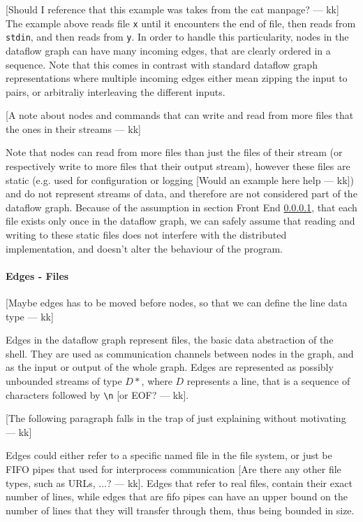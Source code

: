 \documentclass[sigplan,10pt,review,anonymous]{acmart}
\newcommand{\kk}[1]{[{\color{magenta}#1 --- kk}]}
\begin{document}
\kk{Should I reference that this example was takes from the cat
  manpage?} The example above reads file \texttt{x} until it
encounters the end of file, then reads from \texttt{stdin}, and then
reads from \texttt{y}. In order to handle this particularity, nodes in
the dataflow graph can have many incoming edges, that are clearly
ordered in a sequence. Note that this comes in contrast with standard
dataflow graph representations where multiple incoming edges either
mean zipping the input to pairs, or arbitraliy interleaving the
different inputs.


\kk{A note about nodes and commands that can write and read from more
  files that the ones in their streams}

Note that nodes can read from more files than just the files of their
stream (or respectively write to more files that their output stream),
however these files are static (e.g. used for configuration or logging
\kk{Would an example here help}) and do not represent streams of data,
and therefore are not considered part of the dataflow graph. Because
of the assumption in section Front End \ref{}, that each file exists
only once in the dataflow graph, we can safely assume that reading and
writing to these static files does not interfere with the distributed
implementation, and doesn't alter the behaviour of the program.

\paragraph{Edges - Files}

\kk{Maybe edges has to be moved before nodes, so that we can define
  the line data type}

Edges in the dataflow graph represent files, the basic data
abstraction of the shell. They are used as communication channels
between nodes in the graph, and as the input or output of the whole
graph. Edges are represented as possibly unbounded streams of type
$D*$, where $D$ represents a line, that is a sequence of characters
followed by \verb|\n| \kk{or EOF?}.

\kk{The following paragraph falls in the trap of just explaining
  without motivating}

Edges could either refer to a specific named file in the file system,
or just be FIFO pipes that used for interprocess communication \kk{Are
  there any other file types, such as URLs, ...?}. Edges that refer to
real files, contain their exact number of lines, while edges that are
fifo pipes can have an upper bound on the number of lines that they
will transfer through them, thus being bounded in size.
\end{document}
